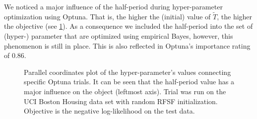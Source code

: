We noticed a major influence of the half-period during hyper-parameter optimization using Optuna\cite{akibaOptunaNextgenerationHyperparameter2019}.
That is, the higher the (initial) value of \(\tilde{T}\), the higher the objective (see \cref{fig:optunaParallelCoordinates}).
As a consequence we included the half-period into the set of (hyper-) parameter that are optimized using empirical Bayes, however, this phenomenon is still in place.
This is also reflected in Optuna's importance rating of \num{0.86}.

\begin{figure}
	\centering
	\resizebox{\linewidth}{!}{}
	\caption{
		Parallel coordinates plot of the hyper-parameter's values connecting specific Optuna\cite{akibaOptunaNextgenerationHyperparameter2019} trials.
		It can be seen that the half-period value has a major influence on the object (leftmost axis).
		Trial was run on the UCI\cite{duaUCIMachineLearning2017} Boston Housing data set with random \ac{RFSF} initialization.
		Objective is the negative log-likelihood on the test data.
	}
	\label{fig:optunaParallelCoordinates}
\end{figure}
